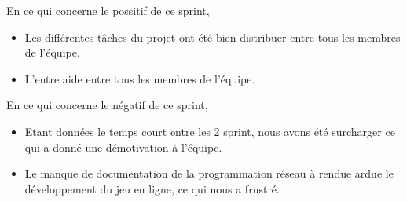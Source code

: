 En ce qui concerne le possitif de ce sprint, 
\begin{itemize}
	\item Les différentes tâches du projet ont été bien distribuer entre tous les membres de l'équipe.
	\item L'entre aide entre tous les membres de l'équipe.
\end{itemize}

En ce qui concerne le négatif de ce sprint,
\begin{itemize}
	\item Etant données le temps court entre les 2 sprint, nous avons été surcharger ce qui a donné une démotivation à l'équipe.
	\item Le manque de documentation de la programmation réseau à rendue ardue le développement du jeu en ligne, ce qui nous a frustré. 
\end{itemize} 